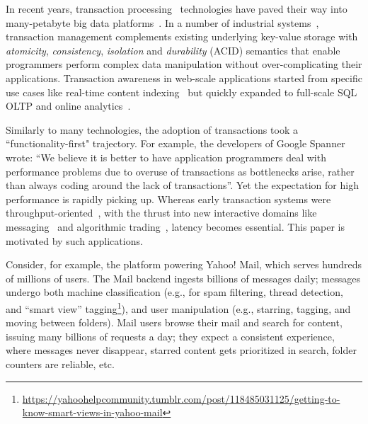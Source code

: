 In recent years, transaction processing~\cite{Gray:1992:TPC:573304} technologies have paved their way into many-petabyte big data 
platforms~\cite{Spanner2012,Percolator2010,Omid2017}. 
In a number of industrial systems~\cite{Percolator2010,Omid2017,tephra,cockroach}, transaction management complements 
existing underlying key-value storage with {\em atomicity}, {\em consistency}, {\em isolation\/} and 
{\em durability} (ACID) semantics that enable programmers perform 
complex data manipulation without over-complicating their applications. Transaction awareness 
in web-scale applications started from specific use cases like real-time content indexing~\cite{Percolator2010,
Omid2017} but quickly expanded to 
full-scale SQL OLTP and online analytics~\cite{Phoenix, F1-2013}.

Similarly to many technologies, the adoption of transactions took a  ``functionality-first" trajectory. 
For example, the developers of Google Spanner~\cite{Spanner2012} wrote: ``We believe it
is better to have application programmers deal with performance problems due to overuse 
of transactions as bottlenecks arise, rather than always coding around the lack of transactions''. 
Yet the expectation for high performance is rapidly picking up. %
Whereas early 
transaction systems were throughput-oriented~\cite{Percolator2010, Omid2017}, 
with the thrust into new interactive domains like messaging~\cite{Borthakur:2011} and algorithmic 
trading~\cite{opentsdb}, latency becomes essential. This paper is motivated by such  applications.

Consider, for example, the platform powering Yahoo! Mail, which serves hundreds of millions of users. 
The Mail backend ingests billions of messages daily; messages undergo both machine 
classification (e.g., for spam filtering, thread detection, and ``smart view'' tagging\footnote{\footnotesize{\url{
https://yahoohelpcommunity.tumblr.com/post/118485031125/getting-to-know-smart-views-in-yahoo-mail}}}),
and user manipulation (e.g., starring, tagging, and moving between folders).    
Mail users browse their mail and search for content, issuing many billions of requests a day; they
expect a consistent experience, where messages never 
disappear, starred content gets prioritized in search, folder counters are reliable, etc.

